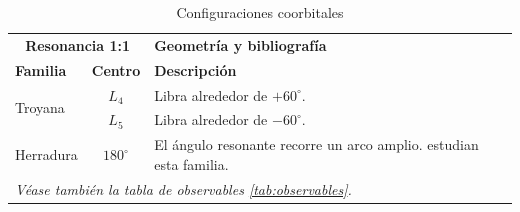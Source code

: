 \begin{table}[ht]
  \caption{Configuraciones coorbitales}
  \label{tab:configuraciones}
  \begin{tabular}{l c p{7cm}}
    \toprule
    \multicolumn{2}{c}{\textbf{Resonancia 1:1}} & \textbf{Geometría y bibliografía} \\
    \textbf{Familia} & \textbf{Centro} & \textbf{Descripción} \\
    \midrule
    \multirow{2}{*}{Troyana} & $L_4$ & Libra alrededor de $+60^\circ$. \citep{MurrayDermott1999,Morais2001} \\
                           & $L_5$ & Libra alrededor de $-60^\circ$. \citet{LaughlinChambers2002} \\
    Herradura & $180^\circ$ & El ángulo resonante recorre un arco amplio. \citeauthor{LaughlinChambers2002} estudian esta familia. \\
    \hline
    \multicolumn{3}{l}{\textit{Véase también la tabla de observables \ref{tab:observables}.}} \\
    \bottomrule
  \end{tabular}
\end{table}
